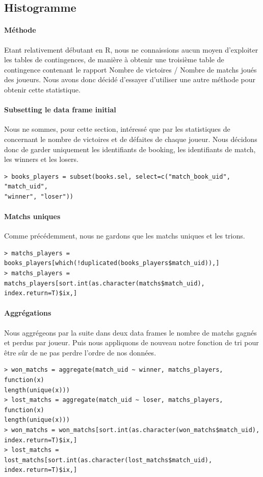 \documentclass{report}
\begin{document}
\begin{appendices}
\subsection{Histogramme} %
\paragraph{Méthode}
Etant relativement débutant en R, nous ne connaissions aucun moyen d'exploiter
les tables de contingences, de manière à obtenir une troisième table de
contingence contenant le rapport Nombre de victoires / Nombre de matchs
joués des joueurs. Nous avons donc décidé d'essayer d'utiliser une autre
méthode pour obtenir cette statistique.
\paragraph{Subsetting le data frame initial}
Nous ne sommes, pour cette section, intéressé que par les statistiques de
concernant le nombre de victoires et de défaites de chaque joueur. Nous décidons
donc de garder uniquement les identifiants de booking, les identifiants de
match, les winners et les losers.
\begin{lstlisting}
> books_players = subset(books.sel, select=c("match_book_uid", "match_uid",
"winner", "loser"))
\end{lstlisting}
\paragraph{Matchs uniques}
Comme précédemment, nous ne gardons que les matchs uniques et les trions.
\begin{lstlisting}
> matchs_players = books_players[which(!duplicated(books_players$match_uid)),]
> matchs_players = matchs_players[sort.int(as.character(matchs$match_uid),
index.return=T)$ix,]
\end{lstlisting}
\paragraph{Aggrégations}
Nous aggrégeons par la suite dans deux data frames le nombre de matchs gagnés et
perdus par joueur. Puis nous appliquons de nouveau notre fonction de tri pour être
sûr de ne pas perdre l'ordre de nos données.
\begin{lstlisting}
> won_matchs = aggregate(match_uid ~ winner, matchs_players, function(x)
length(unique(x)))
> lost_matchs = aggregate(match_uid ~ loser, matchs_players, function(x)
length(unique(x)))
> won_matchs = won_matchs[sort.int(as.character(won_matchs$match_uid),
index.return=T)$ix,]
> lost_matchs = lost_matchs[sort.int(as.character(lost_matchs$match_uid),
index.return=T)$ix,]
\end{lstlisting}

\end{appendices}
\end{document}
